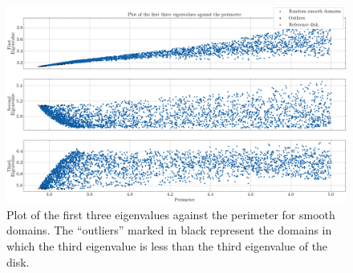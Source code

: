 \begin{figure}[!htb]
    \centering
    \begin{minipage}[c]{0.8\textwidth}
        \centering
        \includegraphics[width=\textwidth]{Images/Dirac/smooth/smooth_domains_scatter_all_eigs_.png}
        \caption{Plot of the first three eigenvalues against the perimeter for smooth domains. The ``outliers'' marked in black represent the domains in which the third eigenvalue is less than the third eigenvalue of the disk.}
        \label{dirac_smooth_domains_scatter_all_eigs}
    \end{minipage}

    \vspace{0.5cm}


\end{figure}
